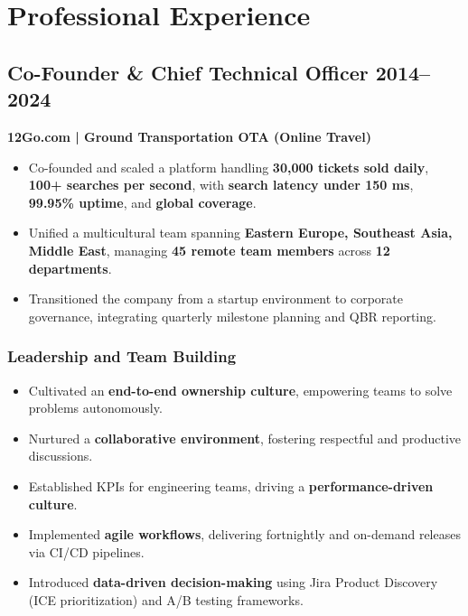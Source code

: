 \documentclass[11pt,a4paper]{article}
\begin{document}
\section*{Professional Experience}

\subsection*{Co-Founder \& Chief Technical Officer \hfill 2014--2024}
\textbf{12Go.com | Ground Transportation OTA (Online Travel)}
\begin{itemize}
    \item Co-founded and scaled a platform handling \textbf{30,000 tickets sold daily}, \textbf{100+ searches per second}, with \textbf{search latency under 150 ms}, \textbf{99.95\% uptime}, and \textbf{global coverage}.
    \item Unified a multicultural team spanning \textbf{Eastern Europe, Southeast Asia, Middle East}, managing \textbf{45 remote team members} across \textbf{12 departments}.
    \item Transitioned the company from a startup environment to corporate governance, integrating quarterly milestone planning and QBR reporting.
\end{itemize}

\subsubsection*{Leadership and Team Building}
\begin{itemize}
    \item Cultivated an \textbf{end-to-end ownership culture}, empowering teams to solve problems autonomously.
    \item Nurtured a \textbf{collaborative environment}, fostering respectful and productive discussions.
    \item Established KPIs for engineering teams, driving a \textbf{performance-driven culture}.
    \item Implemented \textbf{agile workflows}, delivering fortnightly and on-demand releases via CI/CD pipelines.
    \item Introduced \textbf{data-driven decision-making} using Jira Product Discovery (ICE prioritization) and A/B testing frameworks.
\end{itemize}
\end{document}

